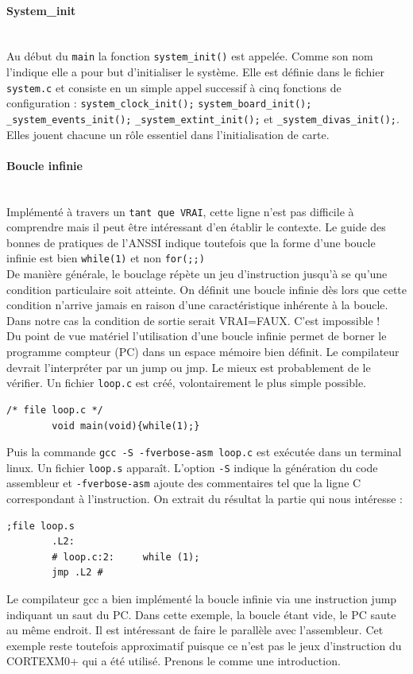 \documentclass[a4paper]{article}
\begin{document}
	\paragraph{System\_init}
	~~\\
	Au début du \texttt{main} la fonction \texttt{system\_init()} est appelée. Comme son nom l'indique elle a pour but d'initialiser le système. Elle est définie dans le fichier \texttt{system.c} et consiste en un simple appel successif à cinq fonctions de configuration : 	 
	\texttt{system\_clock\_init();}
	\texttt{system\_board\_init();}
	\texttt{\_system\_events\_init();}
	\texttt{\_system\_extint\_init();}
	et  \texttt{\_system\_divas\_init();}.
	Elles jouent chacune un rôle essentiel dans l'initialisation de carte.
	
	\paragraph{Boucle infinie}
	~~\\
	Implémenté à travers un \texttt{tant que VRAI}, cette ligne n'est pas difficile à comprendre mais il peut être intéressant d'en établir le contexte. Le guide des bonnes de pratiques de l'ANSSI\cite{ANSSI2021} indique toutefois que la forme d'une boucle infinie est bien \texttt{while(1)} et non \texttt{for(;;)}\\
	De manière générale, le bouclage répète un jeu d'instruction jusqu'à se qu'une condition particulaire soit atteinte. On définit une boucle infinie dès lors que cette condition n'arrive jamais en raison d'une caractéristique inhérente à la boucle. Dans notre cas la condition de sortie serait VRAI=FAUX. C'est impossible ! \\
	Du point de vue matériel l'utilisation d'une boucle infinie permet de borner le programme compteur (PC) dans un espace mémoire bien définit. Le compilateur devrait l'interpréter par un jump ou jmp. Le mieux est probablement de le vérifier. Un fichier \texttt{loop.c} est créé, volontairement le plus simple possible.
	\begin{lstlisting}[style=CStyle]
		/* file loop.c */
		void main(void){while(1);}
	\end{lstlisting}
	Puis la commande \texttt{gcc -S -fverbose-asm loop.c} est exécutée dans un terminal linux. Un fichier \texttt{loop.s} apparaît. L'option \texttt{-S} indique la génération du code assembleur et \texttt{-fverbose-asm} ajoute des commentaires tel que la ligne C correspondant à l'instruction. On extrait du résultat la partie qui nous intéresse :
	\begin{lstlisting}[language={[x86masm]Assembler}]
		;file loop.s
		.L2:
		# loop.c:2: 	while (1);
		jmp	.L2	#
	\end{lstlisting}
	Le compilateur gcc a bien implémenté la boucle infinie via une instruction jump indiquant un saut du PC. Dans cette exemple, la boucle étant vide, le PC saute au même endroit. Il est intéressant de faire le parallèle avec l'assembleur. Cet exemple reste toutefois approximatif puisque ce n'est pas le jeux d'instruction du CORTEXM0+ qui a été utilisé. Prenons le comme une introduction.
	
\end{document}
